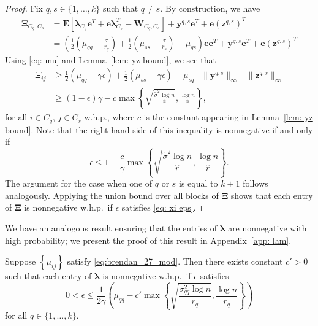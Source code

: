 \documentclass[twoside,11pt]{article}
\newcommand{\E}{\mathbf{E}}
\newcommand{\bs}{\boldsymbol}
\newcommand{\0}{\bs{0}}
\newcommand{\sbra}[1] {\ensuremath{ \left[ #1\right]}} %
\newcommand{\rbra}[1]{\ensuremath{\left( #1 \right)}} %
\newcommand{\bra}[1]{\ensuremath{\left\{ #1 \right\}}} %
\begin{document}
{\begin{proof}
	Fix $q,s \in \{1, \dots, k\}$ such that $q \neq s$.
	By construction, we have
	\begin{align*}
	\bs{\Xi}_{C_q,C_s} %
	&= \E\sbra{\bs{\lambda}_{C_q}\bs{e}^T+\bs{e}\bs{\lambda}_{C_s}^T - \bs{W}_{C_q,C_s}}+ \bs{y}^{q,s}\bs{e}^T+\bs{e}
	\left(\bs{z}^{q,s}\right)^T \\
	&= \left(\frac{1}{2} \left(\mu_{qq} - \frac{\tau}{r_q} \right) + \frac{1}{2} \left(\mu_{ss} - \frac{\tau}{r_s} \right) - \mu_{qs} \right)
	\bs{e}\bs{e}^T + \bs{y}^{q,s}\bs{e}^T+\bs{e}\left(\bs{z}^{q,s}\right)^T
	\end{align*}
	Using
	\eqref{eq: mu} and
	 Lemma~\ref{lem: yz bound}, we see that
	\begin{align*}
	\Xi_{ij} &\geq \frac{1}{2} \left(\mu_{qq} - \gamma \epsilon \right) + \frac{1}{2} \left(\mu_{ss} - \gamma \epsilon \right) - \mu_{sq} -
	\|\bs{y}^{q,s}\|_{\infty}-\|\bs{z}^{q,s}\|_{\infty} \\
	& \ge (1 - \epsilon)\gamma - c \max \bra{ \sqrt{ \frac{\tilde \sigma^2 \log n}{\hat r}} ,
			\frac{\log n}{\hat r} },
	\end{align*}
	for all $i \in C_q$, $j\in C_s$ w.h.p., where $c$ is the constant appearing in
	Lemma~\ref{lem: yz bound}. Note that
	the right-hand side of this inequality is nonnegative	if and only if
	\[\epsilon \leq 1 - \frac{c}{\gamma}\max \bra{ \sqrt{ \frac{\tilde \sigma^2 \log n}{\hat r}} ,
			\frac{\log n}{\hat r} } . \]
	The argument for the case when one of $q$ or $s$ is equal to $k+1$
	follows analogously.
	Applying the union bound over all blocks of \(\bs \Xi\) shows that each entry
	of $\bs{\Xi}$ is nonnegative
	w.h.p.~if $\epsilon$ satisfies \eqref{eq: xi eps}.
\end{proof}
\medskip

We have an analogous result ensuring that the entries of \(\bs\lambda\) are nonnegative
with high probability; we present the proof of this result in Appendix~\ref{app: lam}.

\begin{proposition} \label{prop: lam}
	Suppose $\bra{\mu_{ij}}$ satisfy \eqref{eq:brendan_27_mod}. Then there
	exists constant $c' > 0$ such that each entry of $\bs{\lambda}$ is nonnegative w.h.p.~if $\epsilon$ satisfies
	\begin{equation} \label{eq: lam eps}
	0 < \epsilon \leq  \frac{1}{2\gamma}
	\rbra{ \mu_{qq}  - c' \max \bra{ \sqrt{  \frac{\sigma_{qq}^2 \log 		n }{r_q} },
			\frac{\log n }{r_q} } }
	\end{equation}
	for all $ q \in \{1,\dots, k\}$.
\end{proposition}

}
\end{document}
